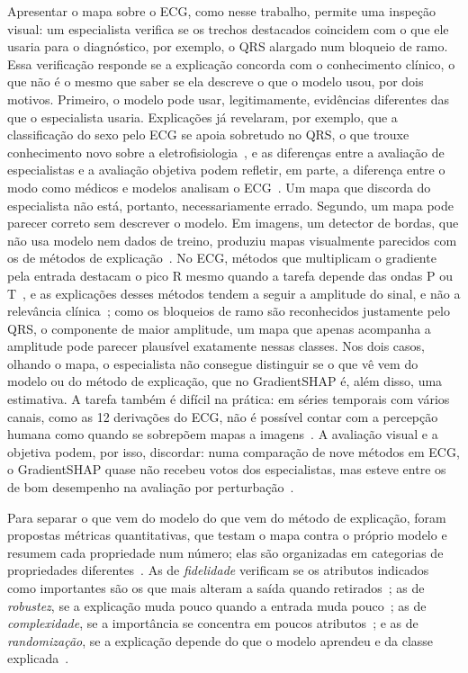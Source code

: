 Apresentar o mapa sobre o ECG, como nesse trabalho, permite uma inspeção visual: um especialista verifica se os trechos destacados coincidem com o que ele usaria para o diagnóstico, por exemplo, o QRS alargado num bloqueio de ramo. Essa verificação responde se a explicação concorda com o conhecimento clínico, o que não é o mesmo que saber se ela descreve o que o modelo usou, por dois motivos. Primeiro, o modelo pode usar, legitimamente, evidências diferentes das que o especialista usaria. Explicações já revelaram, por exemplo, que a classificação do sexo pelo ECG se apoia sobretudo no QRS, o que trouxe conhecimento novo sobre a eletrofisiologia~\cite{hicks2021}, e as diferenças entre a avaliação de especialistas e a avaliação objetiva podem refletir, em parte, a diferença entre o modo como médicos e modelos analisam o ECG~\cite{storas2025}. Um mapa que discorda do especialista não está, portanto, necessariamente errado. Segundo, um mapa pode parecer correto sem descrever o modelo. Em imagens, um detector de bordas, que não usa modelo nem dados de treino, produziu mapas visualmente parecidos com os de métodos de explicação~\cite{adebayo2018}. No ECG, métodos que multiplicam o gradiente pela entrada destacam o pico R mesmo quando a tarefa depende das ondas P ou T~\cite{wagner2024}, e as explicações desses métodos tendem a seguir a amplitude do sinal, e não a relevância clínica~\cite{gumpfer2026}; como os bloqueios de ramo são reconhecidos justamente pelo QRS, o componente de maior amplitude, um mapa que apenas acompanha a amplitude pode parecer plausível exatamente nessas classes. Nos dois casos, olhando o mapa, o especialista não consegue distinguir se o que vê vem do modelo ou do método de explicação, que no GradientSHAP é, além disso, uma estimativa. A tarefa também é difícil na prática: em séries temporais com vários canais, como as 12 derivações do ECG, não é possível contar com a percepção humana como quando se sobrepõem mapas a imagens~\cite{ismail2020}. A avaliação visual e a objetiva podem, por isso, discordar: numa comparação de nove métodos em ECG, o GradientSHAP quase não recebeu votos dos especialistas, mas esteve entre os de bom desempenho na avaliação por perturbação~\cite{storas2025}.

Para separar o que vem do modelo do que vem do método de explicação, foram propostas métricas quantitativas, que testam o mapa contra o próprio modelo e resumem cada propriedade num número; elas são organizadas em categorias de propriedades diferentes~\cite{hedstrom2023quantus}. As de \emph{fidelidade} verificam se os atributos indicados como importantes são os que mais alteram a saída quando retirados~\cite{bhatt2020}; as de \emph{robustez}, se a explicação muda pouco quando a entrada muda pouco~\cite{yeh2019}; as de \emph{complexidade}, se a importância se concentra em poucos atributos~\cite{bhatt2020}; e as de \emph{randomização}, se a explicação depende do que o modelo aprendeu e da classe explicada~\cite{adebayo2018,sixt2020}.

